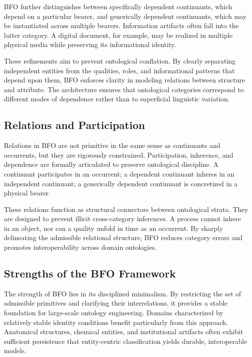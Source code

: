 \documentclass[12pt]{article}
\begin{document}
BFO further distinguishes between specifically dependent continuants, which depend on a particular bearer, and generically dependent continuants, which may be instantiated across multiple bearers. Information artifacts often fall into the latter category. A digital document, for example, may be realized in multiple physical media while preserving its informational identity.

These refinements aim to prevent ontological conflation. By clearly separating independent entities from the qualities, roles, and informational patterns that depend upon them, BFO enforces clarity in modeling relations between structure and attribute. The architecture ensures that ontological categories correspond to different modes of dependence rather than to superficial linguistic variation.

\subsection{Relations and Participation}

Relations in BFO are not primitive in the same sense as continuants and occurrents, but they are rigorously constrained. Participation, inherence, and dependence are formally articulated to preserve ontological discipline. A continuant participates in an occurrent; a dependent continuant inheres in an independent continuant; a generically dependent continuant is concretized in a physical bearer.

These relations function as structural connectors between ontological strata. They are designed to prevent illicit cross-category inferences. A process cannot inhere in an object, nor can a quality unfold in time as an occurrent. By sharply delineating the admissible relational structure, BFO reduces category errors and promotes interoperability across domain ontologies.

\subsection{Strengths of the BFO Framework}

The strength of BFO lies in its disciplined minimalism. By restricting the set of admissible primitives and clarifying their interrelations, it provides a stable foundation for large-scale ontology engineering. Domains characterized by relatively stable identity conditions benefit particularly from this approach. Anatomical structures, chemical entities, and institutional artifacts often exhibit sufficient persistence that entity-centric classification yields durable, interoperable models.
\end{document}
